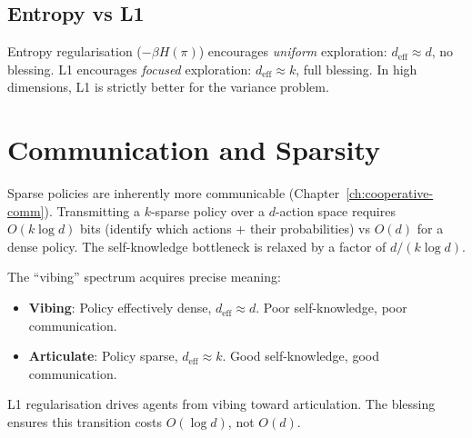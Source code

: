 \subsection{Entropy vs L1}

Entropy regularisation ($-\beta H(\pi)$) encourages \emph{uniform} exploration: $d_{\text{eff}} \approx d$, no blessing. L1 encourages \emph{focused} exploration: $d_{\text{eff}} \approx k$, full blessing. In high dimensions, L1 is strictly better for the variance problem.


\section{Communication and Sparsity}

Sparse policies are inherently more communicable (Chapter~\ref{ch:cooperative-comm}). Transmitting a $k$-sparse policy over a $d$-action space requires $O(k \log d)$ bits (identify which actions + their probabilities) vs $O(d)$ for a dense policy. The self-knowledge bottleneck is relaxed by a factor of $d/(k \log d)$.

The ``vibing'' spectrum acquires precise meaning:
\begin{itemize}
    \item \textbf{Vibing}: Policy effectively dense, $d_{\text{eff}} \approx d$. Poor self-knowledge, poor communication.
    \item \textbf{Articulate}: Policy sparse, $d_{\text{eff}} \approx k$. Good self-knowledge, good communication.
\end{itemize}

L1 regularisation drives agents from vibing toward articulation. The blessing ensures this transition costs $O(\log d)$, not $O(d)$.
